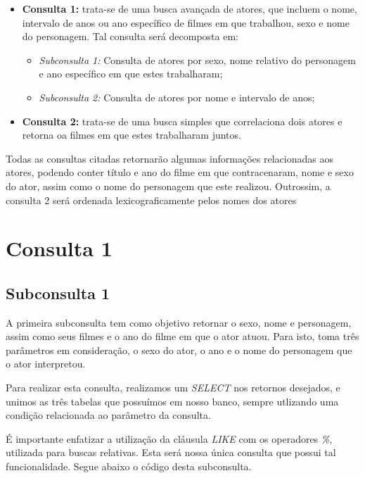 \documentclass[
	12pt,				%
	oneside,			%
	a4paper,			%
	brazil				%
	]{abntex2}
\begin{document}
\begin{itemize}

\item \textbf{Consulta 1:} trata-se de uma busca avançada de atores, que incluem o nome, intervalo de anos ou ano específico de filmes em que trabalhou, sexo e nome do personagem. Tal consulta será decomposta em:
\begin{itemize}
\item\textit{ Subconsulta 1:} Consulta de atores por sexo, nome relativo do personagem e ano específico em que estes trabalharam;
\item \textit{Subconsulta 2:} Consulta de atores por nome e intervalo de anos;
\end{itemize}
\item \textbf{Consulta 2:} trata-se de uma busca simples que correlaciona dois atores e retorna oa filmes em que estes trabalharam juntos.
\end{itemize}

Todas as consultas citadas retornarão algumas informações relacionadas aos atores, podendo conter título e ano do filme em que contracenaram, nome e sexo do ator, assim como o nome do personagem que este realizou. Outrossim, a consulta 2 será ordenada lexicograficamente pelos nomes dos atores

\section{Consulta 1}

\subsection{Subconsulta 1}
A primeira subconsulta tem como objetivo retornar o sexo, nome e personagem, assim como seus filmes e o ano do filme em que o ator atuou. Para isto, toma três parâmetros em consideração, o sexo do ator, o ano e o nome do personagem que o ator interpretou.

Para realizar esta consulta, realizamos um \textit{SELECT} nos retornos desejados, e unimos as três tabelas que possuímos em nosso banco, sempre utlizando uma condição relacionada ao parâmetro da consulta. 

É importante enfatizar a utilização da cláusula \textit{LIKE} com os operadores \textit{\%}, utilizada para buscas relativas. Esta será nossa única consulta que possui tal funcionalidade. Segue abaixo o código desta subconsulta.
\\
\end{document}
